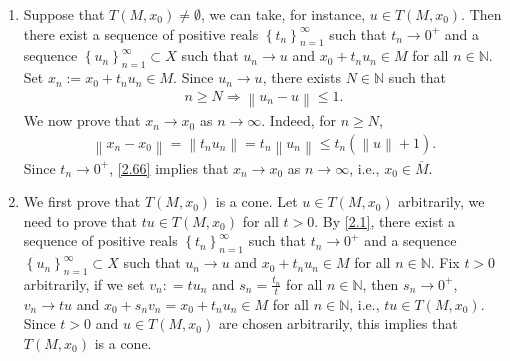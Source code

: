 \documentclass[a4paper]{article}
\numberwithin{equation}{section}
\begin{document}
\begin{enumerate}
\item Suppose that $T\left( {M,{x_0}} \right) \ne \emptyset $, we can take, for instance, $u\in T\left(M,x_0\right)$. Then there exist a sequence of positive reals $\left\{ {{t_n}} \right\}_{n = 1}^\infty $ such that $t_n \to 0^+$ and a sequence $\left\{ {{u_n}} \right\}_{n = 1}^\infty  \subset X$ such that $u_n\to u$ and $x_0+t_n u_n\in M$ for all $n\in \mathbb{N}$. Set $x_n:=x_0+t_nu_n \in M$. Since $u_n\to u$, there exists $N\in \mathbb{N}$ such that 
\begin{align}
n \ge N \Rightarrow \left\| {{u_n} - u} \right\| \le 1.
\end{align}
We now prove that $x_n\to x_0$ as $n\to \infty$. Indeed, for $n\ge N$,
\begin{align}
\label{2.66}
\left\| {{x_n} - {x_0}} \right\| = \left\| {{t_n}{u_n}} \right\| = {t_n}\left\| {{u_n}} \right\| \le {t_n}\left( {\left\| u \right\| + 1} \right).
\end{align}
Since $t_n\to 0^+$, \eqref{2.66} implies that $x_n \to x_0$ as $n\to \infty$, i.e., $x_0\in \overline{M}$. 
\item We first prove that $T\left(M,x_0\right)$ is a cone. Let $u\in T\left(M,x_0\right)$ arbitrarily, we need to prove that $tu\in T\left(M,x_0\right)$ for all $t>0$. By \eqref{2.1}, there exist a sequence of positive reals $\left\{ {{t_n}} \right\}_{n = 1}^\infty $ such that $t_n\to 0^+$ and a sequence $\left\{ {{u_n}} \right\}_{n = 1}^\infty  \subset X$ such that $u_n\to u$ and ${x_0} + {t_n}{u_n} \in M$ for all $n\in \mathbb{N}$. Fix $t>0$ arbitrarily, if we set ${v_n}: = t{u_n}$ and ${s_n} = \frac{{{t_n}}}{t}$ for all $n\in \mathbb{N}$, then $s_n\to 0^+$, ${v_n} \to tu$ and ${x_0} + {s_n}{v_n} = {x_0} + {t_n}{u_n} \in M$ for all $n\in \mathbb{N}$, i.e., $tu\in T\left(M,x_0\right)$. Since $t>0$ and $u\in T\left(M,x_0\right)$ are chosen arbitrarily, this implies that $T\left(M,x_0\right)$ is a cone. 


\end{enumerate}
\end{document}
